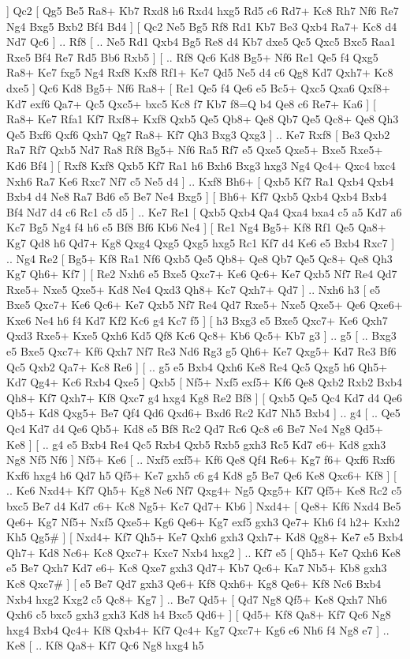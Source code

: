   ]  Qc2 [  Qg5 Be5  Ra8+ Kb7  Rxd8 h6  Rxd4 hxg5  Rd5 c6  Rd7+ Kc8  Rh7 Nf6  Re7 Ng4  Bxg5 Bxb2  Bf4 Bd4   ]  [  Qc2 Ne5  Bg5 Rf8  Rd1 Kb7  Be3 Qxb4  Ra7+ Kc8  d4 Nd7  Qc6   ] .. Rf8 [ .. Ne5  Rd1 Qxb4  Bg5 Re8  d4 Kb7  dxe5 Qc5  Qxc5 Bxc5  Raa1 Rxe5  Bf4 Re7  Rd5 Bb6  Rxb5   ]  [ .. Rf8  Qc6 Kd8  Bg5+ Nf6  Re1 Qe5  f4 Qxg5  Ra8+ Ke7  fxg5 Ng4  Rxf8 Kxf8  Rf1+ Ke7  Qd5 Ne5  d4 c6  Qg8 Kd7  Qxh7+ Kc8  dxe5   ]  Qc6   Kd8    Bg5+   Nf6    Ra8+ [  Re1 Qe5  f4 Qe6  e5 Bc5+  Qxc5 Qxa6  Qxf8+ Kd7  exf6 Qa7+  Qc5 Qxc5+  bxc5 Kc8  f7 Kb7  f8=Q b4  Qe8 c6  Re7+ Ka6   ]  [  Ra8+ Ke7  Rfa1 Kf7  Rxf8+ Kxf8  Qxb5 Qe5  Qb8+ Qe8  Qb7 Qe5  Qc8+ Qe8  Qh3 Qe5  Bxf6 Qxf6  Qxh7 Qg7  Ra8+ Kf7  Qh3 Bxg3  Qxg3   ] .. Ke7   Rxf8 [  Be3 Qxb2  Ra7 Rf7  Qxb5 Nd7  Ra8 Rf8  Bg5+ Nf6  Ra5 Rf7  e5 Qxe5  Qxe5+ Bxe5  Rxe5+ Kd6  Bf4   ]  [  Rxf8 Kxf8  Qxb5 Kf7  Ra1 h6  Bxh6 Bxg3  hxg3 Ng4  Qc4+ Qxc4  bxc4 Nxh6  Ra7 Ke6  Rxc7 Nf7  c5 Ne5  d4   ] .. Kxf8    Bh6+ [  Qxb5 Kf7  Ra1 Qxb4  Qxb4 Bxb4  d4 Ne8  Ra7 Bd6  e5 Be7  Ne4 Bxg5   ]  [  Bh6+ Kf7  Qxb5 Qxb4  Qxb4 Bxb4  Bf4 Nd7  d4 c6  Rc1 c5  d5   ] .. Ke7    Re1 [  Qxb5 Qxb4  Qa4 Qxa4  bxa4 c5  a5 Kd7  a6 Kc7  Bg5 Ng4  f4 h6  e5 Bf8  Bf6 Kb6  Ne4   ]  [  Re1 Ng4  Bg5+ Kf8  Rf1 Qe5  Qa8+ Kg7  Qd8 h6  Qd7+ Kg8  Qxg4 Qxg5  Qxg5 hxg5  Rc1 Kf7  d4 Ke6  e5 Bxb4  Rxc7   ] .. Ng4    Re2 [  Bg5+ Kf8  Ra1 Nf6  Qxb5 Qe5  Qb8+ Qe8  Qb7 Qe5  Qc8+ Qe8  Qh3 Kg7  Qh6+ Kf7   ]  [  Re2 Nxh6  e5 Bxe5  Qxc7+ Ke6  Qc6+ Ke7  Qxb5 Nf7  Re4 Qd7  Rxe5+ Nxe5  Qxe5+ Kd8  Ne4 Qxd3  Qh8+ Kc7  Qxh7+ Qd7   ] .. Nxh6    h3 [  e5 Bxe5  Qxc7+ Ke6  Qc6+ Ke7  Qxb5 Nf7  Re4 Qd7  Rxe5+ Nxe5  Qxe5+ Qe6  Qxe6+ Kxe6  Ne4 h6  f4 Kd7  Kf2 Kc6  g4 Kc7  f5   ]  [  h3 Bxg3  e5 Bxe5  Qxc7+ Ke6  Qxh7 Qxd3  Rxe5+ Kxe5  Qxh6 Kd5  Qf8 Kc6  Qc8+ Kb6  Qc5+ Kb7  g3   ] .. g5 [ .. Bxg3  e5 Bxe5  Qxc7+ Kf6  Qxh7 Nf7  Re3 Nd6  Rg3 g5  Qh6+ Ke7  Qxg5+ Kd7  Re3 Bf6  Qc5 Qxb2  Qa7+ Kc8  Re6   ]  [ .. g5  e5 Bxb4  Qxh6 Ke8  Re4 Qc5  Qxg5 h6  Qh5+ Kd7  Qg4+ Kc6  Rxb4 Qxe5   ]  Qxb5 [  Nf5+ Nxf5  exf5+ Kf6  Qe8 Qxb2  Rxb2 Bxb4  Qh8+ Kf7  Qxh7+ Kf8  Qxc7 g4  hxg4 Kg8  Re2 Bf8   ]  [  Qxb5 Qe5  Qc4 Kd7  d4 Qe6  Qb5+ Kd8  Qxg5+ Be7  Qf4 Qd6  Qxd6+ Bxd6  Rc2 Kd7  Nh5 Bxb4   ] .. g4 [ .. Qe5  Qc4 Kd7  d4 Qe6  Qb5+ Kd8  e5 Bf8  Rc2 Qd7  Rc6 Qc8  e6 Be7  Ne4 Ng8  Qd5+ Ke8   ]  [ .. g4  e5 Bxb4  Re4 Qc5  Rxb4 Qxb5  Rxb5 gxh3  Rc5 Kd7  e6+ Kd8  gxh3 Ng8  Nf5 Nf6   ]  Nf5+   Ke6 [ .. Nxf5  exf5+ Kf6  Qe8 Qf4  Re6+ Kg7  f6+ Qxf6  Rxf6 Kxf6  hxg4 h6  Qd7 h5  Qf5+ Ke7  gxh5 c6  g4 Kd8  g5 Be7  Qe6 Ke8  Qxc6+ Kf8   ]  [ .. Ke6  Nxd4+ Kf7  Qh5+ Kg8  Ne6 Nf7  Qxg4+ Ng5  Qxg5+ Kf7  Qf5+ Ke8  Rc2 c5  bxc5 Be7  d4 Kd7  c6+ Kc8  Ng5+ Kc7  Qd7+ Kb6   ]  Nxd4+ [  Qe8+ Kf6  Nxd4 Be5  Qe6+ Kg7  Nf5+ Nxf5  Qxe5+ Kg6  Qe6+ Kg7  exf5 gxh3  Qe7+ Kh6  f4 h2+  Kxh2 Kh5  Qg5#   ]  [  Nxd4+ Kf7  Qh5+ Ke7  Qxh6 gxh3  Qxh7+ Kd8  Qg8+ Ke7  e5 Bxb4  Qh7+ Kd8  Nc6+ Kc8  Qxc7+ Kxc7  Nxb4 hxg2   ] .. Kf7    e5 [  Qh5+ Ke7  Qxh6 Ke8  e5 Be7  Qxh7 Kd7  e6+ Kc8  Qxe7 gxh3  Qd7+ Kb7  Qc6+ Ka7  Nb5+ Kb8  gxh3 Kc8  Qxc7#   ]  [  e5 Be7  Qd7 gxh3  Qe6+ Kf8  Qxh6+ Kg8  Qe6+ Kf8  Nc6 Bxb4  Nxb4 hxg2  Kxg2 c5  Qc8+ Kg7   ] .. Be7    Qd5+ [  Qd7 Ng8  Qf5+ Ke8  Qxh7 Nh6  Qxh6 c5  bxc5 gxh3  gxh3 Kd8  h4 Bxc5  Qd6+   ]  [  Qd5+ Kf8  Qa8+ Kf7  Qc6 Ng8  hxg4 Bxb4  Qc4+ Kf8  Qxb4+ Kf7  Qc4+ Kg7  Qxc7+ Kg6  e6 Nh6  f4 Ng8  e7   ] .. Ke8 [ .. Kf8  Qa8+ Kf7  Qc6 Ng8  hxg4 h5  
